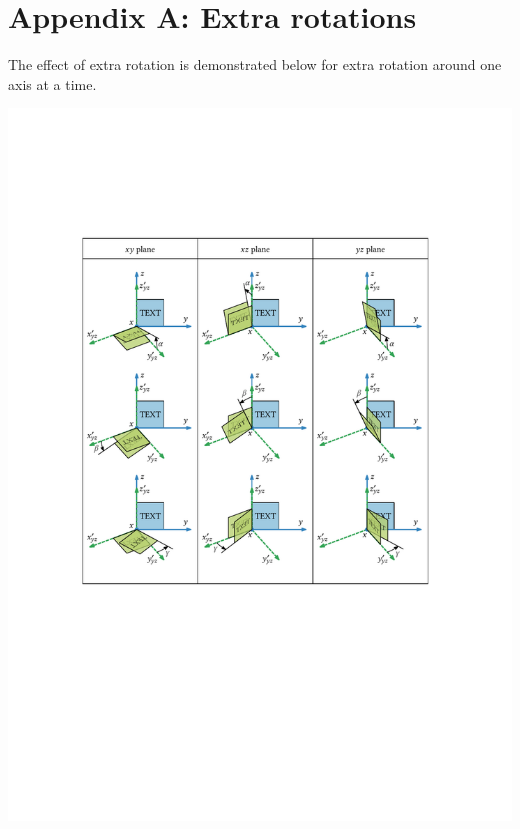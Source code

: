 \documentclass[11pt,a4paper]{article}
\begin{document}
\clearpage
\section*{Appendix A: Extra rotations}
\label{sec:appendix_A}

The effect of extra rotation is demonstrated below for extra rotation around one axis at a time.

\begin{center}

\includegraphics[scale=1.0]{pdf/projection_explained_extra_rot_matrix.pdf}
\end{center}
\end{document}
